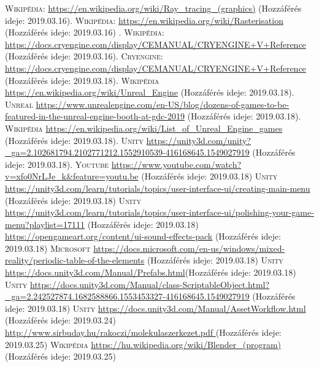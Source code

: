 \documentclass[colorlinks]{thesis-ekf}
\theoremstyle{definition}
\theoremstyle{remark}
\begin{document}
\begin{thebibliography}{1}
	 \textsc{Wikipédia}: \url{https://en.wikipedia.org/wiki/Ray_tracing_(graphics)} (Hozzáférés ideje: 2019.03.16).
	 \textsc{Wikipédia}: \url{https://en.wikipedia.org/wiki/Rasterisation} (Hozzáférés ideje: 2019.03.16)
	. \textsc{Wikipédia}: \url{https://docs.cryengine.com/display/CEMANUAL/CRYENGINE+V+Reference} (Hozzáférés ideje: 2019.03.16).
	 \textsc{Cryengine}: \url{https://docs.cryengine.com/display/CEMANUAL/CRYENGINE+V+Reference} (Hozzáférés ideje: 2019.03.18).
	 \textsc{Wikipédia} \url{https://en.wikipedia.org/wiki/Unreal_Engine} (Hozzáférés ideje: 2019.03.18).
	 \textsc{Unreal} \url{https://www.unrealengine.com/en-US/blog/dozens-of-games-to-be-featured-in-the-unreal-engine-booth-at-gdc-2019} (Hozzáférés ideje: 2019.03.18).
	 \textsc{Wikipédia} \url{https://en.wikipedia.org/wiki/List_of_Unreal_Engine_games} (Hozzáférés ideje: 2019.03.18).
	 \textsc{Unity} \url{https://unity3d.com/unity?_ga=2.102681794.2102771212.1552910539-416168645.1549027919} (Hozzáférés ideje: 2019.03.18).
	\textsc{Youtube} \url{https://www.youtube.com/watch?v=xfo0NrLJe_k&feature=youtu.be} (Hozzáférés ideje: 2019.03.18)
	\textsc{Unity} \url{https://unity3d.com/learn/tutorials/topics/user-interface-ui/creating-main-menu} (Hozzáférés ideje: 2019.03.18)
	\textsc{Unity} \url{https://unity3d.com/learn/tutorials/topics/user-interface-ui/polishing-your-game-menu?playlist=17111} (Hozzáférés ideje: 2019.03.18)
	 \url{https://opengameart.org/content/ui-sound-effects-pack} (Hozzáférés ideje: 2019.03.18)
	 \textsc{Microsoft} \url{https://docs.microsoft.com/en-us/windows/mixed-reality/periodic-table-of-the-elements} (Hozzáférés ideje: 2019.03.18)
	 \textsc{Unity} \url{https://docs.unity3d.com/Manual/Prefabs.html}(Hozzáférés ideje: 2019.03.18)
	 \textsc{Unity} \url{https://docs.unity3d.com/Manual/class-ScriptableObject.html?_ga=2.242527874.1682588866.1553453327-416168645.1549027919} (Hozzáférés ideje: 2019.03.18)
	 \textsc{Unity} \url{https://docs.unity3d.com/Manual/AssetWorkflow.html}  (Hozzáférés ideje: 2019.03.24)
	 \url{http://www.sirbuday.hu/rakoczi/molekulaszerkezet.pdf } (Hozzáférés ideje: 2019.03.25)
	 \textsc{Wikipédia} \url{https://hu.wikipedia.org/wiki/Blender_(program)} (Hozzáférés ideje: 2019.03.25)
\end{thebibliography}
\end{document}
